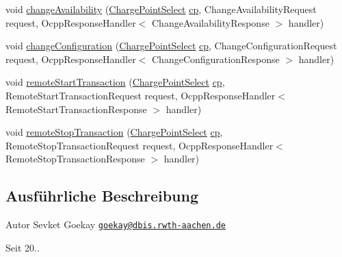 \begin{DoxyCompactItemize}
\item 
void \hyperlink{interfacede_1_1rwth_1_1idsg_1_1steve_1_1ocpp_1_1_charge_point_service12___invoker_ae1f9ecd4dbcd9a6f74afa0b9e00ecfed}{change\-Availability} (\hyperlink{classde_1_1rwth_1_1idsg_1_1steve_1_1repository_1_1dto_1_1_charge_point_select}{Charge\-Point\-Select} \hyperlink{get_transaction_ids_8js_a02fb69feb56940fd46d72ea6a60e511f}{cp}, Change\-Availability\-Request request, Ocpp\-Response\-Handler$<$ Change\-Availability\-Response $>$ handler)
\item 
void \hyperlink{interfacede_1_1rwth_1_1idsg_1_1steve_1_1ocpp_1_1_charge_point_service12___invoker_a0285980099377e7809157ae2954b48ea}{change\-Configuration} (\hyperlink{classde_1_1rwth_1_1idsg_1_1steve_1_1repository_1_1dto_1_1_charge_point_select}{Charge\-Point\-Select} \hyperlink{get_transaction_ids_8js_a02fb69feb56940fd46d72ea6a60e511f}{cp}, Change\-Configuration\-Request request, Ocpp\-Response\-Handler$<$ Change\-Configuration\-Response $>$ handler)
\item 
void \hyperlink{interfacede_1_1rwth_1_1idsg_1_1steve_1_1ocpp_1_1_charge_point_service12___invoker_a1d7403c93e91272adfa16d250c836523}{remote\-Start\-Transaction} (\hyperlink{classde_1_1rwth_1_1idsg_1_1steve_1_1repository_1_1dto_1_1_charge_point_select}{Charge\-Point\-Select} \hyperlink{get_transaction_ids_8js_a02fb69feb56940fd46d72ea6a60e511f}{cp}, Remote\-Start\-Transaction\-Request request, Ocpp\-Response\-Handler$<$ Remote\-Start\-Transaction\-Response $>$ handler)
\item 
void \hyperlink{interfacede_1_1rwth_1_1idsg_1_1steve_1_1ocpp_1_1_charge_point_service12___invoker_a4fdc6e02e0d797ee8ea2aae5a16ca87a}{remote\-Stop\-Transaction} (\hyperlink{classde_1_1rwth_1_1idsg_1_1steve_1_1repository_1_1dto_1_1_charge_point_select}{Charge\-Point\-Select} \hyperlink{get_transaction_ids_8js_a02fb69feb56940fd46d72ea6a60e511f}{cp}, Remote\-Stop\-Transaction\-Request request, Ocpp\-Response\-Handler$<$ Remote\-Stop\-Transaction\-Response $>$ handler)
\end{DoxyCompactItemize}


\subsection{Ausführliche Beschreibung}
\begin{DoxyAuthor}{Autor}
Sevket Goekay \href{mailto:goekay@dbis.rwth-aachen.de}{\tt goekay@dbis.\-rwth-\/aachen.\-de} 
\end{DoxyAuthor}
\begin{DoxySince}{Seit}
20.. 
\end{DoxySince}


